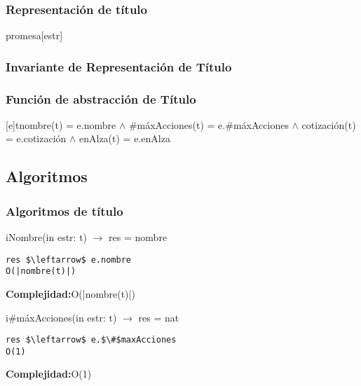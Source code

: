 \subsubsection{Representaci\'on de t\'itulo}
\begin{Estructura}{promesa}[estr]
    \begin{Tupla}[estr]
    \end{Tupla}
\end{Estructura}


 \subsubsection{Invariante de Representaci\'on de T\'itulo}


\subsubsection{Funci\'on de abstracci\'on de T\'itulo}

[e]{t}{nombre(t) = e.nombre $\land$ $\#$m\'axAcciones(t) = e.$\#$m\'axAcciones $\land$ cotizaci\'on(t) = e.cotizaci\'on $\land$ enAlza(t) = e.enAlza}

  \subsection{Algoritmos}
\subsubsection{Algoritmos de t\'itulo}

iNombre(in estr: t) $\rightarrow$ res = nombre
\begin{lstlisting}[mathescape]
 res $\leftarrow$ e.nombre                                                        O(|nombre(t)|)
\end{lstlisting}
\textbf{Complejidad:}O(|nombre(t)|)

i$\#$m\'axAcciones(in estr: t) $\rightarrow$ res = nat
\begin{lstlisting}[mathescape]
 res $\leftarrow$ e.$\#$maxAcciones                                                   O(1)
\end{lstlisting}
\textbf{Complejidad:}O(1)


